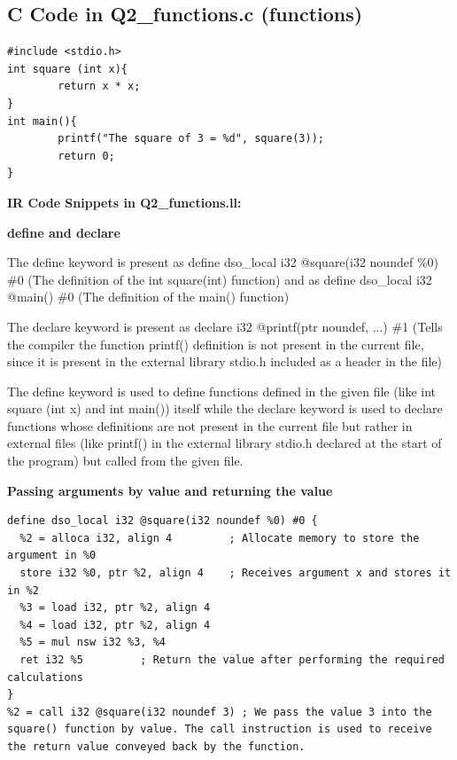 \documentclass[11pt,a4paper]{article}
\begin{document}
\subsection{C Code in Q2\_functions.c (functions)}

\begin{lstlisting}
#include <stdio.h>
int square (int x){
        return x * x;
}
int main(){
        printf("The square of 3 = %d", square(3));
        return 0;
}
\end{lstlisting}

\medskip\noindent\textbf{IR Code Snippets in Q2\_functions.ll:}\par




\textbf{define and declare}


The define keyword is present as define dso\_local i32 @square(i32 noundef \%0) \#0 (The definition of the int square(int) function) and as define dso\_local i32 @main() \#0  (The definition of the main() function)


The declare keyword is present as declare i32 @printf(ptr noundef, ...) \#1 (Tells the compiler the function printf() definition is not present in the current file, since it is present in the external library stdio.h included as a header in the file)


The define keyword is used to define functions defined in the given file (like int square (int x) and int main()) itself while the declare keyword is used to declare functions whose definitions are not present in the current file but rather in external files (like printf() in the external library stdio.h declared at the start of the program) but called from the given file. 


\textbf{Passing arguments by value and returning the value}




\begin{lstlisting}
define dso_local i32 @square(i32 noundef %0) #0 {
  %2 = alloca i32, align 4         ; Allocate memory to store the argument in %0
  store i32 %0, ptr %2, align 4    ; Receives argument x and stores it in %2
  %3 = load i32, ptr %2, align 4
  %4 = load i32, ptr %2, align 4
  %5 = mul nsw i32 %3, %4
  ret i32 %5         ; Return the value after performing the required calculations
}
%2 = call i32 @square(i32 noundef 3) ; We pass the value 3 into the square() function by value. The call instruction is used to receive the return value conveyed back by the function.
\end{lstlisting}
\end{document}
